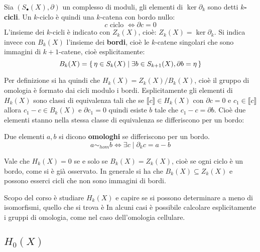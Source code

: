 \begin{definition}
  Sia $ (S_\bullet(X),\partial) $ un complesso di moduli, gli elementi di $ \ker{\partial_k} $ sono detti
  \textbf{$ k $-cicli}. Un $ k $-ciclo è quindi una $ k $-catena
  con bordo nullo:
  \[
    c \text{ ciclo } \Leftrightarrow \partial c = 0
  \]
  L'insieme dei $ k $-cicli è indicato con $ Z_k(X) $, cioè: $ Z_k(X) = \ker{\partial_k} $.
  Si indica invece con $ B_k(X) $ l'insieme dei \textbf{bordi}, cioè le $ k $-catene singolari
  che sono immagini di $ k+1 $-catene, cioè esplicitamente:
  \[
    B_k(X) = \set{\eta \in S_k(X) | \exists b \in S_{k+1}(X), \partial b = \eta}
  \]
\end{definition}
Per definizione si ha quindi che $ H_k(X) = {Z_k(X)} \slash {B_k(X)} $, cioè il
gruppo di omologia è formato dai cicli modulo i bordi. Esplicitamente gli
elementi di $ H_k(X) $ sono classi di equivalenza tali che se $ \llbracket c \rrbracket \in H_k(X) $
con $ \partial c = 0 $ e $ c_1 \in  \llbracket c \rrbracket  $ allora $ c_1 - c \in B_k(X) $ e
$ \partial c_1 = 0 $ quindi esiste $ b $ tale che $ c_1 - c = \partial b $. Cioè due elementi
stanno nella stessa classe di equivalenza se differiscono per un bordo:

\begin{definition}
  Due elementi $ a,b $ si dicono \textbf{omologhi}  se differiscono per un bordo.
  \[
    a \sim_{hom} b \Leftrightarrow \exists c \; | \; \partial_k c = a - b
  \]
\end{definition}

\begin{osservation}
  Vale che $ H_k(X) = 0 $ se e solo se $ B_k(X) = Z_k(X) $, cioè se ogni ciclo è
  un bordo, come si è già osservato. In generale si ha che
  $ B_k(X) \subseteq Z_k(X) $ e possono esserci cicli che non sono immagini di bordi.
\end{osservation}
Scopo del corso è studiare $ H_k(X) $ e capire se si possono determinare a meno
di isomorfismi, quello che si trova è In alcuni casi è possibile calcolare
esplicitamente i gruppi di omologia, come nel caso dell'omologia cellulare.

\subsection{$ H_0(X) $}

